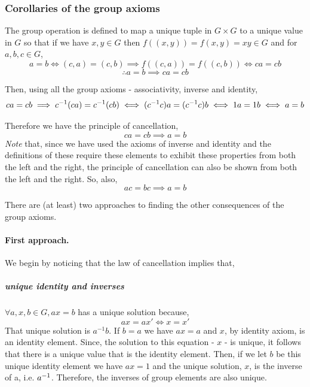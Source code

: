 \documentclass[MathsNotesBase.tex]{subfiles}
\begin{document}
{		\bigskip\bigskip
		\subsubsection{Corollaries of the group axioms}
		The group operation is defined to map a unique tuple in $G \times G$ to a unique value in $G$ so that if we have $x,y \in G$ then $f((x, y)) = f(x,y) = xy \in G$ and for $a,b,c \in G$,
		\[ a = b \iff (c, a) = (c, b) \implies f((c, a)) = f((c, b)) \iff ca = cb \]
		\[ \therefore a = b \implies ca = cb \]
		
		Then, using all the group axioms - associativity, inverse and identity,
		\[ ca = cb \implies {c}^{-1}(ca) = {c}^{-1}(cb) \iff ({c}^{-1}c)a = ({c}^{-1}c)b \iff 1a = 1b \iff a = b \]
		
		Therefore we have the principle of cancellation,
		\[ ca = cb \implies a = b \]
		\textit{Note} that, since we have used the axioms of inverse and identity and the definitions of these require these elements to exhibit these properties from both the left and the right, the principle of cancellation can also be shown from both the left and the right. So, also,
		\[ ac = bc \implies a = b \]
		
		\bigskip\bigskip
		There are (at least) two approaches to finding the other consequences of the group axioms.
		\paragraph*{First approach.} We begin by noticing that the law of cancellation implies that,
		\subparagraph*{unique identity and inverses}$\forall a,x,b \in G, ax = b$ has a unique solution because,
		\[ ax = ax' \iff x = x' \]
		That unique solution is $a^{-1}b$. If $b=a$ we have $ax=a$ and $x$, by identity axiom, is an identity element. Since, the solution to this equation - $x$ - is unique, it follows that there is a unique value that is the identity element. Then, if we let $b$ be this unique identity element we have $ax=1$ and the unique solution, $x$, is the inverse of a, i.e. ${a}^{-1}$. Therefore, the inverses of group elements are also unique.
		
}
\end{document}
